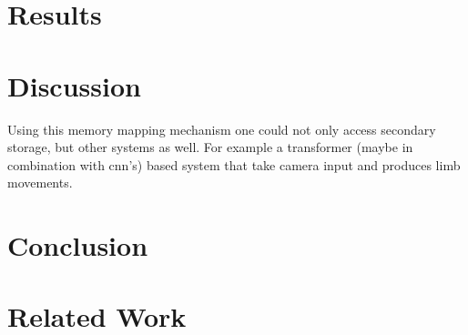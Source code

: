 \documentclass[11pt]{article}
\begin{document}
\section{Results}



\section{Discussion}

Using this memory mapping mechanism one could not only access secondary storage, but other systems as well. For example a transformer (maybe in combination with cnn's) based system that take camera input and produces limb movements. 

\section{Conclusion}





\section{Related Work}
\end{document}
